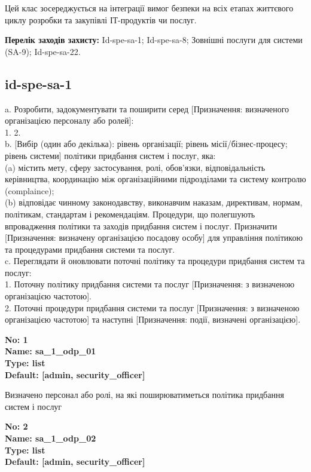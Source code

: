 \documentclass{article}
\begin{document}
Цей клас зосереджується на інтеграції вимог безпеки на всіх етапах життєвого циклу розробки та закупівлі ІТ-продуктів чи послуг.

\textbf{Перелік заходів захисту:} Id-spe-sa-1; Id-spe-sa-8; Зовнішні послуги для системи (SA-9); Id-spe-sa-22.

\subsection{id-spe-sa-1}
a. Розробити, задокументувати та поширити серед [Призначення: визначеного організацією персоналу або ролей]:\\ 
1. 2.\\ 
b. [Вибір (один або декілька): рівень організації; рівень місії/бізнес-процесу; рівень системи] політики придбання систем і послуг, яка:\\ 
(a) містить мету, сферу застосування, ролі, обов'язки, відповідальність керівництва, координацію між організаційними підрозділами та систему контролю (complaince);\\ 
(b) відповідає чинному законодавству, виконавчим наказам, директивам, нормам, політикам, стандартам і рекомендаціям. Процедури, що полегшують впровадження політики та заходів придбання систем і послуг. Призначити [Призначення: визначену організацією посадову особу] для управління політикою та процедурами придбання системи та послуг.\\ 
c. Переглядати й оновлювати поточні політику та процедури придбання систем та послуг:\\ 
1. Поточну політику придбання системи та послуг [Призначення: з визначеною організацією частотою].\\ 
2. Поточні процедури придбання системи та послуг [Призначення: з визначеною організацією частотою] та наступні [Призначення: події, визначені організацією].

\vspace{10pt}
{\footnotesize\bfseries
No: 1\\
Name: sa\_\allowbreak{}1\_\allowbreak{}odp\_\allowbreak{}01\\
Type: list\\
Default: [\textquotedbl{}admin\textquotedbl{}, \textquotedbl{}security\_\allowbreak{}officer\textquotedbl{}]
}

{\footnotesize Визначено персонал або ролі, на які поширюватиметься політика придбання систем і послуг}


{\footnotesize\bfseries
No: 2\\
Name: sa\_\allowbreak{}1\_\allowbreak{}odp\_\allowbreak{}02\\
Type: list\\
Default: [\textquotedbl{}admin\textquotedbl{}, \textquotedbl{}security\_\allowbreak{}officer\textquotedbl{}]
}
\end{document}
